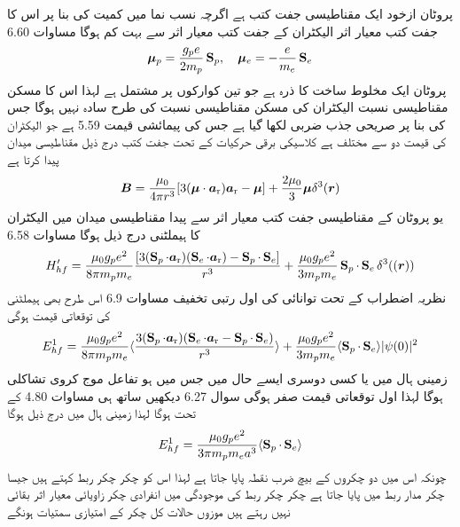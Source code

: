 پروٹان ازخود ایک مقناطیسی جفت کتب  ہے اگرچہ نسب نما میں کمیت کی بنا پر اس کا جفت کتب معیار اثر الیکٹران کے جفت کتب معیار اثر سے بہت کم ہوگا مساوات 6.60 
\begin{align}
{\ensuremath{{\boldsymbol{\mu}}}}_p = \frac{g_p e}{2 m_p} \operatorname{\mathbf{S}}_p, \quad {\ensuremath{{\boldsymbol{\mu}}}}_e = - \frac{e}{m_e} \operatorname{\mathbf{S}}_e
\end{align}
پروٹان ایک مخلوط ساخت کا ذرہ ہے جو تین کوارکوں پر مشتمل ہے لہذا اس کا مسکن مقناطیسی نسبت الیکٹران کی مسکن مقناطیسی نسبت کی طرح سادہ نہیں ہوگا جس کی بنا پر  صريحى  جذب ضربی  لکھا گیا ہے جس کی پیمائشی قیمت 5.59 ہے جو الیکٹران کی قیمت دو سے مختلف ہے کلاسیکی برقی حرکیات کے تحت جفت کتب   درج ذیل مقناطیسی میدان پیدا کرتا ہے 
\begin{align}
{\ensuremath{{\boldsymbol{B}}}} = \frac{\mu_0}{4 \pi r^3} [3 ({{\boldsymbol{\mu}}} \cdot {\ensuremath{{\boldsymbol{a}}}_{\textup{r}}}) {{\boldsymbol{a}}_{\textup{r}}} - {{\boldsymbol{\mu}}}] + \frac{2 \mu_0}{3} {{\boldsymbol{\mu}}} \delta^3 ({{\boldsymbol{r}}})
\end{align}
یو پروٹان کے مقناطیسی جفت کتب معیار اثر سے پیدا مقناطیسی میدان میں الیکٹران کا ہیملٹنی درج ذیل ہوگا مساوات 6.58 
\begin{align}
H'_{hf} = \frac{\mu_0 g_p e^2}{8 \pi m_p m_e} \frac{[3(\operatorname{\mathbf{S}}_p \cdot {\ensuremath{{\boldsymbol{a}}}_{\textup{r}}})(\operatorname{\mathbf{S}}_e \cdot {\ensuremath{{\boldsymbol{a}}}_{\textup{r}}}) - \operatorname{\mathbf{S}}_p \cdot \operatorname{\mathbf{S}}_e]}{r^3} + \frac{\mu_0 g_p e^2}{3m_p m_e} \operatorname{\mathbf{S}}_p \cdot \operatorname{\mathbf{S}}_e \delta^3 (({{\boldsymbol{r}}}))
\end{align}
نظریہ اضطراب کے تحت توانائی کی اول رتبی تخفیف مساوات 6.9 اس طرح بھی ہيملٹنی کی توقعاتی قیمت ہوگی 
\begin{align}
E_{hf}^1 = \frac{\mu_0 g_p e^2}{8 \pi m_p m_e} \langle \frac{3(\operatorname{\mathbf{S}}_p \cdot {\ensuremath{{\boldsymbol{a}}}_{\textup{r}}})(\operatorname{\mathbf{S}}_e \cdot {\ensuremath{{\boldsymbol{a}}}_{\textup{r}}} - \operatorname{\mathbf{S}}_p \cdot \operatorname{\mathbf{S}}_e)}{r^3} \rangle + \frac{\mu _0 g_p e^2}{3 m_p m_e} \langle \operatorname{\mathbf{S}}_p \cdot \operatorname{\mathbf{S}}_e \rangle |\psi (0)|^2
\end{align}
زمینی ہال میں یا کسی دوسری ایسے حال میں جس میں  ہو تفاعل موج کروی تشاکلی ہوگا لہذا اول توقعاتی قیمت صفر ہوگی سوال 6.27 دیکھیں ساتھ ہی مساوات 4.80 کے تحت  ہوگا لہذا زمینی ہال میں درج ذیل ہوگا 
\begin{align}
E_{hf}^1 = \frac{\mu_0 g_p e^2}{3 \pi m_p m_e a^3} \langle \operatorname{\mathbf{S}}_p \cdot \operatorname{\mathbf{S}}_e \rangle
\end{align}
چونکہ اس میں دو چکروں کے بیچ ضرب نقطہ پایا جاتا ہے لہذا اس کو چکر چکر ربط کہتے ہیں جیسا چکر مدار ربط میں  پایا جاتا ہے چکر چکر ربط کی موجودگی میں انفرادی چکر زاویائی معیار اثر بقائی نہیں رہتے ہیں موزوں حالات کل چکر کے امتیازی سمتیات ہونگے 
